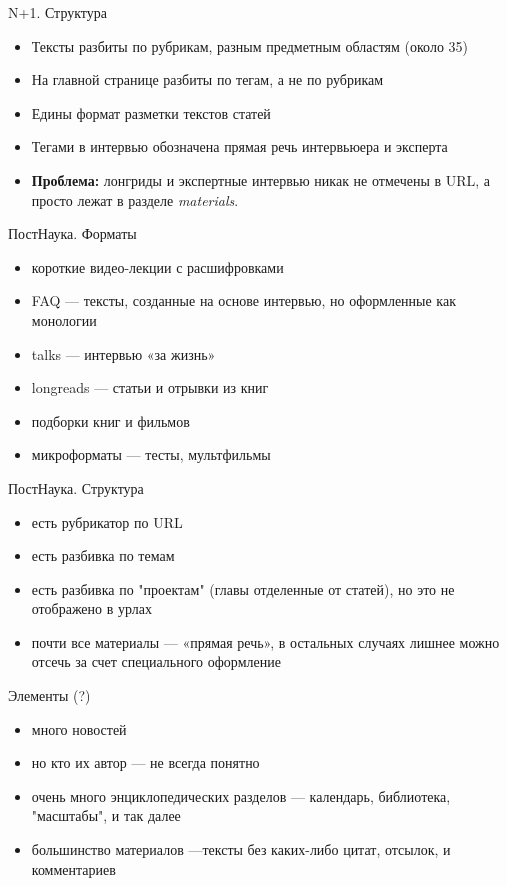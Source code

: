 \documentclass{beamer}
\begin{document}
\begin{frame}{N+1. Структура}
\begin{itemize}
\item Тексты разбиты по рубрикам, разным предметным областям (около 35)
\item На главной странице разбиты по тегам, а не по рубрикам
\item Едины формат разметки текстов статей
\item Тегами в интервью обозначена прямая речь интервьюера и эксперта
\item \textbf{Проблема:} лонгриды и экспертные интервью никак не отмечены в URL, а просто лежат в разделе \textit{materials}. 
\end{itemize}

\end{frame}


\begin{frame}{ПостНаука. Форматы}
\begin{itemize}
	\item короткие видео-лекции с расшифровками
	\item FAQ — тексты, созданные на основе интервью, но оформленные как монологии
    \item talks — интервью «за жизнь» 
	\item longreads — статьи и отрывки из книг
	\item подборки книг и фильмов
    \item микроформаты — тесты, мультфильмы
\end{itemize}
\end{frame}

\begin{frame}{ПостНаука. Структура}
\begin{itemize}
	\item есть рубрикатор по URL
	\item есть разбивка по темам
    \item есть разбивка по "проектам" (главы отделенные от статей), но это не отображено в урлах
	\item почти все материалы — «прямая речь», в остальных случаях лишнее можно отсечь за счет специального оформление

\end{itemize}
\end{frame}

\begin{frame}{Элементы (?)}
\begin{itemize}
	\item много новостей
	\item но кто их автор — не всегда понятно
    \item очень много энциклопедических разделов — календарь, библиотека, "масштабы", и так далее
	\item большинство материалов —тексты без каких-либо цитат, отсылок, и комментариев

\end{itemize}
\end{frame}
\end{document}
